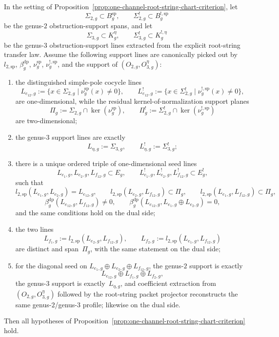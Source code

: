 \begin{proposition}\label{prop:one-channel-intrinsic-line-detection-criterion}
In the setting of
Proposition~\textup{\ref{prop:one-channel-root-string-chart-criterion}},
let
\[
\Sigma_{2,g}\subset B_g^{\mathrm{sp}},
\qquad
\Sigma_{2,g}^!\subset B_g^{!,\mathrm{sp}}
\]
be the genus-$2$ obstruction-support spans, and let
\[
\Sigma_{3,g}\subset K_g^\eta,
\qquad
\Sigma_{3,g}^!\subset K_g^{!,\eta}
\]
be the genus-$3$ obstruction-support lines extracted from the explicit
root-string transfer law.  Assume the following support lines are
canonically picked out by
$l_{2,\mathrm{sp}}$, $\beta_g^{\mathrm{dp}}$,
$\nu_g^{\mathrm{sp}}$, $\nu_g^{!,\mathrm{sp}}$, and the support of
$(O_{2,g},O_{3,g}^\eta)$:
\begin{enumerate}[label=\textup{(\roman*)}]
\item the distinguished simple-pole cocycle lines
  \[
  L_{e_{12},g}
  :=
  \{x\in \Sigma_{2,g}\mid \nu_g^{\mathrm{sp}}(x)\neq 0\},
  \qquad
  L_{e_{12},g}^!
  :=
  \{x\in \Sigma_{2,g}^!\mid \nu_g^{!,\mathrm{sp}}(x)\neq 0\},
  \]
  are one-dimensional, while the residual kernel-of-normalization
  support planes
  \[
  \Pi_g:=\Sigma_{2,g}\cap\ker(\nu_g^{\mathrm{sp}}),
  \qquad
  \Pi_g^!:=\Sigma_{2,g}^!\cap\ker(\nu_g^{!,\mathrm{sp}})
  \]
  are two-dimensional;
\item the genus-$3$ support lines are exactly
  \[
  L_{\eta,g}:=\Sigma_{3,g},
  \qquad
  L_{\eta,g}^!:=\Sigma_{3,g}^!;
  \]
\item there is a unique ordered triple of one-dimensional seed lines
  \[
  L_{e_1,g},L_{e_2,g},L_{f_{12},g}\subset E_g,
  \qquad
  L_{e_1,g}^!,L_{e_2,g}^!,L_{f_{12},g}^!\subset E_g^!,
  \]
  such that
  \[
  l_{2,\mathrm{sp}}(L_{e_1,g},L_{e_2,g})=L_{e_{12},g},
  \qquad
  l_{2,\mathrm{sp}}(L_{e_2,g},L_{f_{12},g})\subset \Pi_g,
  \qquad
  l_{2,\mathrm{sp}}(L_{e_1,g},L_{f_{12},g})\subset \Pi_g,
  \]
  \[
  \beta_g^{\mathrm{dp}}(L_{e_{12},g},L_{f_{12},g})\neq 0,
  \qquad
  \beta_g^{\mathrm{dp}}(L_{e_{12},g},L_{e_1,g}\oplus L_{e_2,g})=0,
  \]
  and the same conditions hold on the dual side;
\item the two lines
  \[
  L_{f_1,g}:=l_{2,\mathrm{sp}}(L_{e_2,g},L_{f_{12},g}),
  \qquad
  L_{f_2,g}:=l_{2,\mathrm{sp}}(L_{e_1,g},L_{f_{12},g})
  \]
  are distinct and span~$\Pi_g$, with the same statement on the dual
  side;
\item for the diagonal seed on
  $L_{e_1,g}\oplus L_{e_2,g}\oplus L_{f_{12},g}$, the genus-$2$
  support is exactly
  \[
  L_{e_{12},g}\oplus L_{f_1,g}\oplus L_{f_2,g},
  \]
  the genus-$3$ support is exactly~$L_{\eta,g}$, and coefficient
  extraction from $(O_{2,g},O_{3,g}^\eta)$ followed by the root-string
  packet projector reconstructs the same genus-$2$/genus-$3$ profile;
  likewise on the dual side.
\end{enumerate}
Then all hypotheses of
Proposition~\ref{prop:one-channel-root-string-chart-criterion} hold.


\end{proposition}
